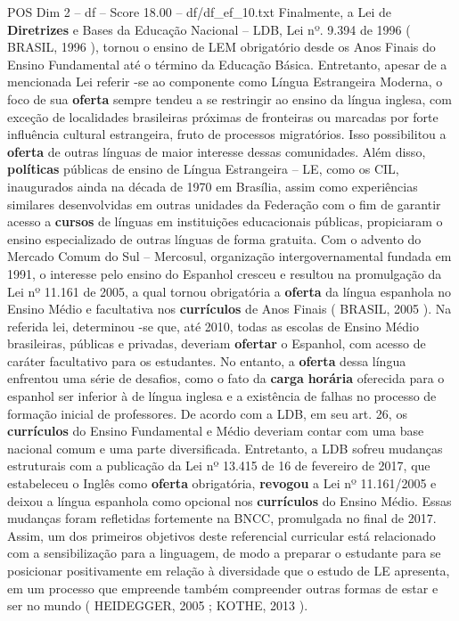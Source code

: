 \begin{textsample}{POS Dim 2 – df – Score 18.00 – df/df\_ef\_10.txt}
Finalmente, a Lei de \textbf{Diretrizes} e Bases da Educação Nacional – LDB, Lei nº. 9.394 de 1996 ( BRASIL, 1996 ), tornou o ensino de LEM obrigatório desde os Anos Finais do Ensino Fundamental até o término da Educação Básica.
Entretanto, apesar de a mencionada Lei referir -se ao componente como Língua Estrangeira Moderna, o foco de sua \textbf{oferta} sempre tendeu a se restringir ao ensino da língua inglesa, com exceção de localidades brasileiras próximas de fronteiras ou marcadas por forte influência cultural estrangeira, fruto de processos migratórios.
Isso possibilitou a \textbf{oferta} de outras línguas de maior interesse dessas comunidades.
Além disso, \textbf{políticas} públicas de ensino de Língua Estrangeira – LE, como os CIL, inaugurados ainda na década de 1970 em Brasília, assim como experiências similares desenvolvidas em outras unidades da Federação com o fim de garantir acesso a \textbf{cursos} de línguas em instituições educacionais públicas, propiciaram o ensino especializado de outras línguas de forma gratuita.
Com o advento do Mercado Comum do Sul – Mercosul, organização intergovernamental fundada em 1991, o interesse pelo ensino do Espanhol cresceu e resultou na promulgação da Lei nº 11.161 de 2005, a qual tornou obrigatória a \textbf{oferta} da língua espanhola no Ensino Médio e facultativa nos \textbf{currículos} de Anos Finais ( BRASIL, 2005 ).
Na referida lei, determinou -se que, até 2010, todas as escolas de Ensino Médio brasileiras, públicas e privadas, deveriam \textbf{ofertar} o Espanhol, com acesso de caráter facultativo para os estudantes.
No entanto, a \textbf{oferta} dessa língua enfrentou uma série de desafios, como o fato da \textbf{carga} \textbf{horária} oferecida para o espanhol ser inferior à de língua inglesa e a existência de falhas no processo de formação inicial de professores.
De acordo com a LDB, em seu art. 26, os \textbf{currículos} do Ensino Fundamental e Médio deveriam contar com uma base nacional comum e uma parte diversificada.
Entretanto, a LDB sofreu mudanças estruturais com a publicação da Lei nº 13.415 de 16 de fevereiro de 2017, que estabeleceu o Inglês como \textbf{oferta} obrigatória, \textbf{revogou} a Lei nº 11.161/2005 e deixou a língua espanhola como opcional nos \textbf{currículos} do Ensino Médio.
Essas mudanças foram refletidas fortemente na BNCC, promulgada no final de 2017.
Assim, um dos primeiros objetivos deste referencial curricular está relacionado com a sensibilização para a linguagem, de modo a preparar o estudante para se posicionar positivamente em relação à diversidade que o estudo de LE apresenta, em um processo que empreende também compreender outras formas de estar e ser no mundo ( HEIDEGGER, 2005 ; KOTHE, 2013 ).

\end{textsample}
